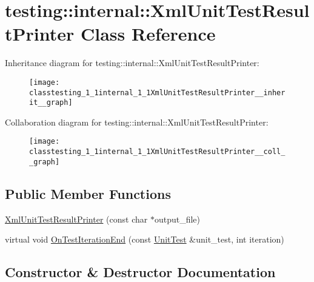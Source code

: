 \hypertarget{classtesting_1_1internal_1_1XmlUnitTestResultPrinter}{}\section{testing\+:\+:internal\+:\+:Xml\+Unit\+Test\+Result\+Printer Class Reference}
\label{classtesting_1_1internal_1_1XmlUnitTestResultPrinter}


Inheritance diagram for testing\+:\+:internal\+:\+:Xml\+Unit\+Test\+Result\+Printer\+:
\nopagebreak
\begin{figure}[H]
\begin{center}
\leavevmode
\texttt{[image: classtesting\_1\_1internal\_1\_1XmlUnitTestResultPrinter\_\_inherit\_\_graph]}
\end{center}
\end{figure}


Collaboration diagram for testing\+:\+:internal\+:\+:Xml\+Unit\+Test\+Result\+Printer\+:
\nopagebreak
\begin{figure}[H]
\begin{center}
\leavevmode
\texttt{[image: classtesting\_1\_1internal\_1\_1XmlUnitTestResultPrinter\_\_coll\_\_graph]}
\end{center}
\end{figure}
\subsection*{Public Member Functions}
\begin{DoxyCompactItemize}
\item 
\hyperlink{classtesting_1_1internal_1_1XmlUnitTestResultPrinter_afdaf88e6764c18ce0dcc3733d7a06e31}{Xml\+Unit\+Test\+Result\+Printer} (const char $\ast$output\+\_\+file)
\item 
virtual void \hyperlink{classtesting_1_1internal_1_1XmlUnitTestResultPrinter_a2ae986dd2f4f2aed31cc6f3bc8c56898}{On\+Test\+Iteration\+End} (const \hyperlink{classtesting_1_1UnitTest}{Unit\+Test} \&unit\+\_\+test, int iteration)
\end{DoxyCompactItemize}


\subsection{Constructor \& Destructor Documentation}
